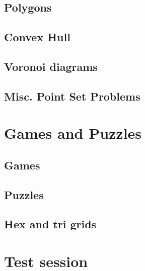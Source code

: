 \documentclass[10pt, a4paper, notitlepage]{report}
\begin{document}
\begin{multicols*}{3}
	\section{Polygons}
	\section{Convex Hull}
	\section{Voronoi diagrams}
	\section{Misc. Point Set Problems}
	
	\chapter{Games and Puzzles}
	\section{Games}
	\section{Puzzles}
	\section{Hex and tri grids}
	
	\appendix
	
	\chapter{Test session}

\end{multicols*}
\end{document}
